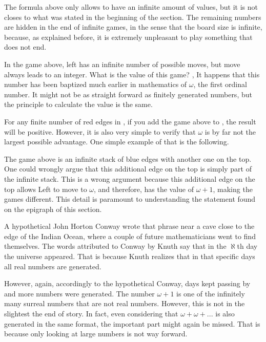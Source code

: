 The formula above only allows \Gm{} to have an infinite amount of values, but it is not closes to what was stated in the beginning of the section. The remaining numbers are hidden in the end of infinite games, in the sense that the board size is infinite, because, as explained before, it is extremely unpleasant to play something that does not end. 



In the game above, left has an infinite number of possible moves, but  move always leads to an integer. What is the value of this game? , It happens that this number has been baptized much earlier in mathematics of $\omega$, the first ordinal number. It might not be as straight forward as finitely generated numbers, but the principle to calculate the value is the same.

For any finite number of red edges in \Gm{}, if you add the game above to \Gm{}, the result will be positive. However, it is also very simple to verify that $\omega$ is by far not the largest possible advantage. One simple  example of that is the following.



The game above is an infinite stack of blue edges with another one on the top. One could wrongly argue that this additional edge on the top is simply part of the infinite stack. This is a wrong argument because this additional edge on the top allows Left to move to $\omega$, and therefore, has the value of $\omega+1$, making the games different. This detail is paramount to understanding the statement found on the epigraph of this section.

A hypothetical John Horton Conway wrote that phrase near a cave close to the edge of the Indian Ocean, where a couple of future mathematicians went to find themselves. The words attributed to Conway by Knuth say that in the $\aleph$th day the universe appeared. That is because Knuth realizes that in that specific days all real numbers are generated.

However, again, accordingly to the hypothetical Conway, days kept passing by and more numbers were generated. The number $\omega+1$ is one of the infinitely many surreal numbers that are not real numbers. However, this is not in the slightest the end of story. In fact, even considering that $\omega + \omega + ...$  is also generated in the same format, the important part might again be missed. That is because only looking at large numbers is not way forward.

